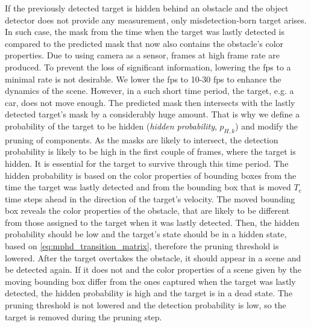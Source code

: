 If the previously detected target is hidden behind an obstacle and the object detector does not provide any
measurement, only misdetection-born target arises. In such case, the mask from the time when the target was lastly
detected is compared to the predicted mask that now also contains the obstacle's color properties. Due to using
camera as
a sensor, frames at high frame rate are produced. To prevent the loss of significant information, lowering the fps to a minimal rate is not desirable. We lower the fps to 10-30 fps to enhance the dynamics of the scene. However, in a such short time
period, the target, e.g. a car, does not move enough. The predicted mask then intersects with the lastly
detected target's mask by a considerably huge amount. That is why we define a probability of the target to be hidden (\textit{hidden probability}, $p_{H,k}$) and modify
the pruning of components. As the masks are likely to intersect, the detection probability is likely to be high in
the first couple of frames, where the target is hidden. It is essential for the target to survive through this time
period. The hidden probability is based on the color properties of bounding boxes from the time the target was lastly
detected
and from the bounding box that is moved $T_c$ time steps ahead in the direction of the target's velocity. The moved
bounding box reveals the color properties of the obstacle, that are likely to be different from those assigned to the
target
when it was lastly detected. Then, the hidden probability should be low and the target's state should be in a hidden
state,
based on \eqref{eq:mphd_transition_matrix}, therefore the pruning threshold is lowered. After the target overtakes the
obstacle,
it should appear in a scene and be detected again. If it does not and the color properties of a scene given by the
moving
bounding box differ from the ones captured when the target was lastly detected, the hidden probability is high and the
target is
in a dead state. The pruning threshold is not lowered and the detection probability is low, so the target is removed
during the pruning step.
